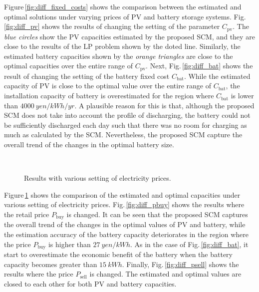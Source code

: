 \documentclass[lettersize,journal]{IEEEtran}
\newcommand{\figref}[1]{Fig.\,\ref{#1}}
\newcommand{\Figref}[1]{Figure\,\ref{#1}}
\begin{document}
\Figref{fig:diff_fixed_costs} shows the comparison between the estimated and optimal solutions under varying prices of PV and battery storage systems. 
\figref{fig:diff_pv} shows the results of changing the setting of the parameter $C_\mathrm{pv}$. 
The \emph{blue circles} show the PV capacities estimated by the proposed SCM, and they are close to the results of the LP problem shown by the doted line. 
Similarly, the estimated battery capacities shown by the \emph{orange triangles} are close to the optimal capacities over the entire range of $C_\mathrm{pv}$. 
%
Next, \figref{fig:diff_bat} shows the result of changing the setting of the battery fixed cost $C_\mathrm{bat}$.  
While the estimated capacity of PV is close to the optimal value over the entire range of $C_\mathrm{bat}$, the installation capacity of battery is overestimated for the region where $C_\mathrm{bat}$ is lower than $\SI{4000}{yen/kWh/yr}$.
A plausible reason for this is that, although the proposed SCM does not take into account the profile of discharging, the battery could not be sufficiently discharged each day such that there was no room for charging as much as calculated by the SCM. 
Nevertheless, the proposed SCM capture the overall trend of the changes in the optimal battery size. 

\begin{figure}[!t]
 \centering
 \\[2mm]
 \caption{Results with various setting of electricity prices.} \label{fig:diff_prices}
\end{figure}


%
\Figref{fig:diff_prices} shows the comparison of the estimated and optimal capacities under various setting of electricity prices. 
\figref{fig:diff_pbuy} shows the results where the retail price $P_\mathrm{buy}$ is changed. 
It can be seen that the proposed SCM captures the overall trend of the changes in the optimal values of PV and battery, while the estimation accuracy of the battery capacity deteriorates in the region where the price $P_\mathrm{buy}$ is higher than $\SI{27}{yen/kWh}$. 
As in the case of \figref{fig:diff_bat}, it start to overestimate the economic benefit of the battery when the battery capacity becomes greater than $\SI{15}{kWh}$. 
Finally, \figref{fig:diff_psell} shows the results where the price $P_\mathrm{sell}$ is changed. 
The estimated and optimal values are closed to each other for both PV and battery capacities. 
\end{document}
